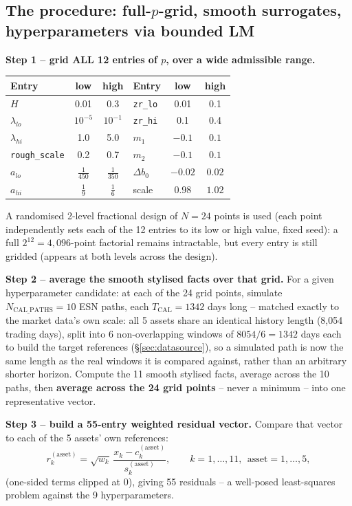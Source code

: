 \documentclass[11pt]{article}
\begin{document}
\subsection{The procedure: full-$p$-grid, smooth surrogates, hyperparameters via bounded LM}
\label{sec:procedure}
\textbf{Step 1 -- grid ALL 12 entries of $p$, over a wide admissible range.}
\begin{center}
\begin{tabular}{lcc|lcc}
\toprule
Entry & low & high & Entry & low & high \\
\midrule
$H$ & 0.01 & 0.3 & \texttt{zr\_lo} & 0.01 & 0.1 \\
$\lambda_{lo}$ & $10^{-5}$ & $10^{-1}$ & \texttt{zr\_hi} & 0.1 & 0.4 \\
$\lambda_{hi}$ & 1.0 & 5.0 & $m_1$ & $-0.1$ & $0.1$ \\
\texttt{rough\_scale} & 0.2 & 0.7 & $m_2$ & $-0.1$ & $0.1$ \\
$a_{lo}$ & $\tfrac1{450}$ & $\tfrac1{350}$ & $\Delta b_0$ & $-0.02$ & $0.02$ \\
$a_{hi}$ & $\tfrac19$ & $\tfrac16$ & scale & $0.98$ & $1.02$ \\
\bottomrule
\end{tabular}
\end{center}
A randomised 2-level fractional design of $N=24$ points is used (each point
independently sets each of the 12 entries to its low or high value, fixed seed): a
full $2^{12}=4{,}096$-point factorial remains intractable, but every entry is still
gridded (appears at both levels across the design).

\textbf{Step 2 -- average the smooth stylised facts over that grid.} For a given
hyperparameter candidate: at each of the 24 grid points, simulate
$N_{\text{CAL\_PATHS}}=10$ ESN paths, each $T_{\text{CAL}}=1342$ days long -- matched
exactly to the market data's own scale: all 5 assets share an identical history length
(8,054 trading days), split into 6 non-overlapping windows of $8054/6=1342$ days each
to build the target references (\S\ref{sec:datasource}), so a simulated path is now the
same length as the real windows it is compared against, rather than an arbitrary
shorter horizon. Compute the 11 smooth stylised facts, average across the 10 paths,
then \textbf{average across the 24 grid points} -- never a minimum -- into one
representative vector.

\textbf{Step 3 -- build a 55-entry weighted residual vector.} Compare that vector to
each of the 5 assets' own references:
\[
r_k^{(\text{asset})} = \sqrt{w_k}\,\frac{x_k-c_k^{(\text{asset})}}{s_k^{(\text{asset})}},
\qquad k=1,\dots,11,\ \ \text{asset}=1,\dots,5,
\]
(one-sided terms clipped at 0), giving 55 residuals -- a well-posed least-squares
problem against the 9 hyperparameters.
\end{document}
